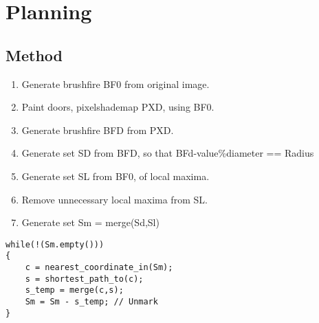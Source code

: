 \section{Planning}
\subsection{Method}
\begin{enumerate}
\item Generate brushfire BF0 from original image.
\item Paint doors, pixelshademap PXD, using BF0.
\item Generate brushfire BFD from PXD. 
\item Generate set SD from BFD, so that BFd-value\%diameter == Radius
\item Generate set SL from BF0, of local maxima. 
\item Remove unnecessary local maxima from SL.
\item Generate set Sm = merge(Sd,Sl)
\end{enumerate}


\begin{verbatim}
while(!(Sm.empty()))
{
	c = nearest_coordinate_in(Sm);
	s = shortest_path_to(c);
	s_temp = merge(c,s);
	Sm = Sm - s_temp; // Unmark
}
\end{verbatim}
